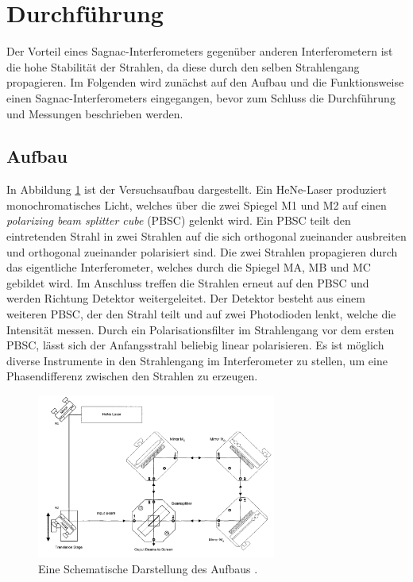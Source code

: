 \section{Durchführung}
\label{sec:Durchführung}

Der Vorteil eines Sagnac-Interferometers gegen\"uber anderen Interferometern ist die hohe Stabilit\"at der Strahlen, da diese durch den selben Strahlengang propagieren.
Im Folgenden wird zun\"achst auf den Aufbau und die Funktionsweise einen Sagnac-Interferometers eingegangen, bevor zum Schluss die Durchf\"uhrung und Messungen beschrieben werden.

\subsection{Aufbau}

In Abbildung \ref{fig:aufbau} ist der Versuchsaufbau dargestellt. Ein HeNe-Laser produziert monochromatisches Licht, welches \"uber die zwei Spiegel M1 und M2 auf einen
\textit{polarizing beam splitter cube} (PBSC) gelenkt wird. Ein PBSC teilt den eintretenden Strahl in zwei Strahlen auf die sich orthogonal zueinander ausbreiten und orthogonal zueinander
polarisiert sind. Die zwei Strahlen propagieren durch das eigentliche Interferometer, welches durch die Spiegel MA, MB und MC gebildet wird. Im Anschluss treffen die Strahlen erneut auf
den PBSC und werden Richtung Detektor weitergeleitet. Der Detektor besteht aus einem weiteren PBSC, der den Strahl teilt und auf zwei Photodioden lenkt, welche die Intensität messen.
Durch ein Polarisationsfilter im Strahlengang vor dem ersten PBSC, lässt sich der Anfangsstrahl beliebig linear polarisieren. Es ist möglich diverse Instrumente in den Strahlengang im Interferometer
zu stellen, um eine Phasendifferenz zwischen den Strahlen zu erzeugen.

\begin{figure}
  \centering
  \includegraphics[width=0.7\textwidth]{aufbau.png}
  \caption{Eine Schematische Darstellung des Aufbaus \cite{anleitung}.}
  \label{fig:aufbau}
\end{figure}

